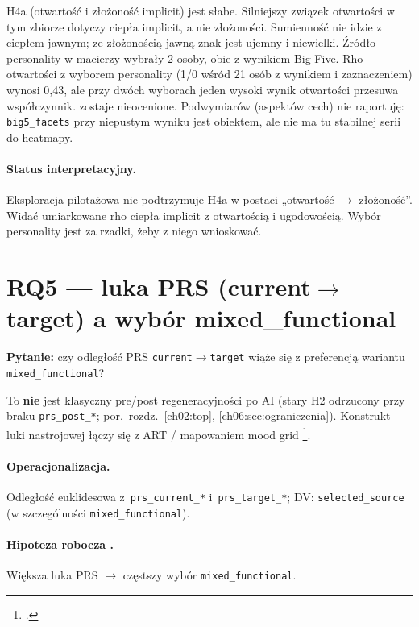 \noindent
H4a (otwartość i złożoność implicit) jest słabe. Silniejszy związek otwartości w tym zbiorze dotyczy ciepła implicit, a nie złożoności. Sumienność nie idzie z ciepłem jawnym; ze złożonością jawną znak jest ujemny i niewielki.
Źródło personality w macierzy wybrały 2 osoby, obie z wynikiem Big Five. Rho otwartości z wyborem personality (1/0 wśród 21 osób z wynikiem i zaznaczeniem) wynosi 0,43, ale przy dwóch wyborach jeden wysoki wynik otwartości przesuwa współczynnik.  zostaje nieocenione.
Podwymiarów (aspektów cech) nie raportuję: \texttt{big5\_facets} przy niepustym wyniku jest obiektem, ale nie ma tu stabilnej serii do heatmapy.

\paragraph{Status interpretacyjny.}
Eksploracja pilotażowa nie podtrzymuje H4a w postaci „otwartość $\rightarrow$ złożoność”. Widać umiarkowane rho ciepła implicit z otwartością i ugodowością. Wybór personality jest za rzadki, żeby z niego wnioskować.

\section{RQ5 --- luka PRS (\texorpdfstring{current$\rightarrow$target}{current-target}) a wybór mixed\_functional}
\label{ch08:sec:rq5}

\textbf{Pytanie:} czy odległość PRS \texttt{current}$\rightarrow$\texttt{target} wiąże się z preferencją wariantu \texttt{mixed\_functional}?

To \textbf{nie} jest klasyczny pre/post regeneracyjności po AI (stary H2 odrzucony przy braku \texttt{prs\_post\_*}; por.\ rozdz.~\ref{ch02:top}, \ref{ch06:sec:ograniczenia}).
Konstrukt luki nastrojowej łączy się z ART / mapowaniem mood grid \footcite{kaplan1995restorative}.

\paragraph{Operacjonalizacja.}
Odległość euklidesowa z~\texttt{prs\_current\_*} i~\texttt{prs\_target\_*}; DV: \texttt{selected\_source} (w szczególności \texttt{mixed\_functional}).

\paragraph{Hipoteza robocza .}
Większa luka PRS $\rightarrow$ częstszy wybór \texttt{mixed\_functional}.

